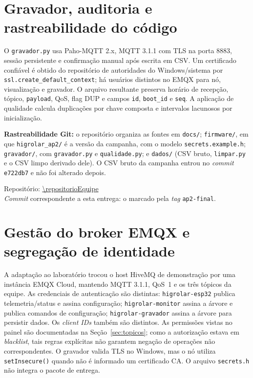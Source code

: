 \section{Gravador, auditoria e rastreabilidade do código}
O \texttt{gravador.py} usa Paho-MQTT 2.x, MQTT 3.1.1 com TLS na porta 8883, sessão persistente e confirmação manual após escrita em CSV. Um certificado confiável é obtido do repositório de autoridades do Windows/sistema por \texttt{ssl.create\_default\_context}; há usuários distintos no EMQX para nó, visualização e gravador. O arquivo resultante preserva horário de recepção, tópico, \texttt{payload}, QoS, flag DUP e campos \texttt{id}, \texttt{boot\_id} e \texttt{seq}. A aplicação de qualidade calcula duplicações por chave composta e intervalos lacunosos por inicialização.
\par\noindent\textbf{Rastreabilidade Git:} o repositório organiza as fontes em \texttt{docs/}; \texttt{firmware/}, em que \texttt{higrolar\_ap2/} é a versão da campanha, com o modelo \texttt{secrets.example.h}; \texttt{gravador/}, com \texttt{gravador.py} e \texttt{qualidade.py}; e \texttt{dados/} (CSV bruto, \texttt{limpar.py} e o CSV limpo derivado dele). O CSV bruto da campanha entrou no \emph{commit} \texttt{e722db7} e não foi alterado depois.
\par\noindent Repositório: \url{\repositorioEquipe}\\
\emph{Commit} correspondente a esta entrega: o marcado pela \emph{tag} \texttt{ap2-final}.

\section{Gestão do broker EMQX e segregação de identidade}
A adaptação ao laboratório trocou o host HiveMQ de demonstração por uma instância EMQX Cloud, mantendo MQTT 3.1.1, QoS~1 e os três tópicos da equipe. As credenciais de autenticação são distintas: \texttt{higrolar-esp32} publica telemetria/status e assina configuração; \texttt{higrolar-monitor} assina a árvore e publica comandos de configuração; \texttt{higrolar-gravador} assina a árvore para persistir dados. Os \emph{client IDs} também são distintos. As permissões vistas no painel são documentadas na Seção~\ref{sec:topicos}; como a autorização estava em \emph{blacklist}, tais regras explícitas não garantem negação de operações não correspondentes. O gravador valida TLS no Windows, mas o nó utiliza \texttt{setInsecure()} quando não é informado um certificado CA. O arquivo \texttt{secrets.h} não integra o pacote de entrega.
